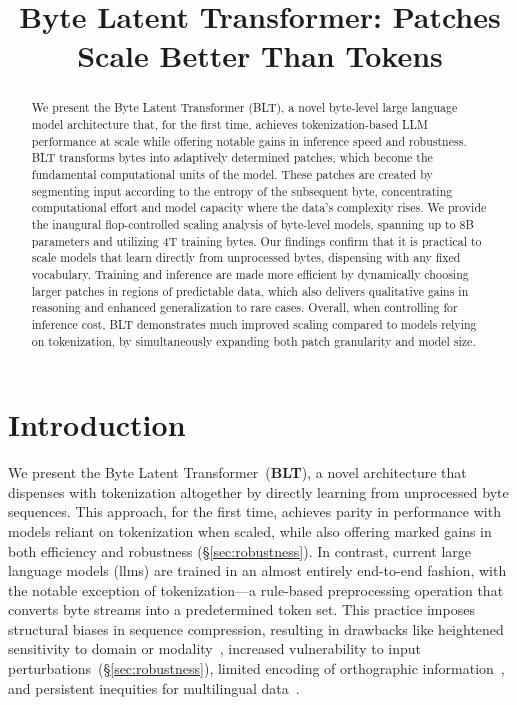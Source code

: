 \title{Byte Latent Transformer: Patches Scale Better Than Tokens}

\begin{abstract}
We present the Byte Latent Transformer (\textsc{BLT}), a novel byte-level large language model architecture that, for the first time, achieves tokenization-based LLM performance at scale while offering notable gains in inference speed and robustness. \textsc{BLT} transforms bytes into adaptively determined patches, which become the fundamental computational units of the model. These patches are created by segmenting input according to the entropy of the subsequent byte, concentrating computational effort and model capacity where the data's complexity rises. We provide the inaugural flop-controlled scaling analysis of byte-level models, spanning up to 8B parameters and utilizing 4T training bytes. Our findings confirm that it is practical to scale models that learn directly from unprocessed bytes, dispensing with any fixed vocabulary. Training and inference are made more efficient by dynamically choosing larger patches in regions of predictable data, which also delivers qualitative gains in reasoning and enhanced generalization to rare cases. Overall, when controlling for inference cost, \textsc{BLT} demonstrates much improved scaling compared to models relying on tokenization, by simultaneously expanding both patch granularity and model size.
\end{abstract}

\section{Introduction}
\label{section:intro}

We present the Byte Latent Transformer~(\textbf{BLT}), a novel architecture that dispenses with tokenization altogether by directly learning from unprocessed byte sequences. This approach, for the first time, achieves parity in performance with models reliant on tokenization when scaled, while also offering marked gains in both efficiency and robustness (\S\ref{sec:robustness}).
In contrast, current large language models (llms) are trained in an almost entirely end-to-end fashion, with the notable exception of tokenization—a rule-based preprocessing operation that converts byte streams into a predetermined token set. This practice imposes structural biases in sequence compression, resulting in drawbacks like heightened sensitivity to domain or modality~\citep{dagangetting}, increased vulnerability to input perturbations~(\S\ref{sec:robustness}), limited encoding of orthographic information~\citep{edman2024cute}, and persistent inequities for multilingual data~\citep{liang2023xlm,petrov2024language,limisiewicz2024myte}.

